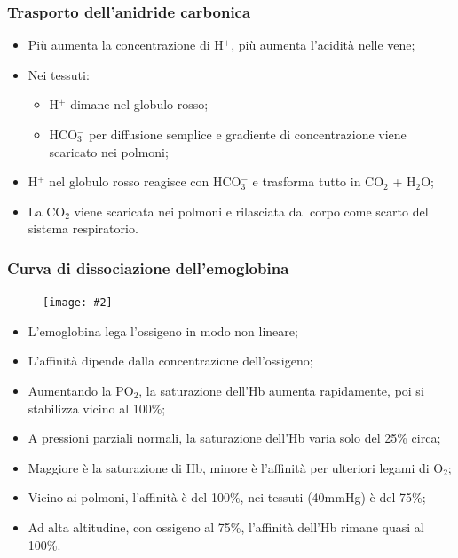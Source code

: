 \documentclass{article}
\newcommand{\cfig}[2]{
    \phantom{}
    \begin{figure}[ht!]
        \begin{center}
            \texttt{[image: \#2]}
        \end{center}
    \end{figure}
}
\begin{document}
\subsubsection{Trasporto dell'anidride carbonica}
\begin{itemize}
    \item Più aumenta la concentrazione di H$^+$, più aumenta l'acidità nelle vene;
    \item Nei tessuti:
        \begin{itemize}
            \item H$^+$ dimane nel globulo rosso;
            \item HCO$_3^-$ per diffusione semplice e gradiente di concentrazione viene
                scaricato nei polmoni;
        \end{itemize}
    \item H$^+$ nel globulo rosso reagisce con HCO$_3^-$ e trasforma tutto in CO$_2$ + H$_2$O;
    \item La CO$_2$ viene scaricata nei polmoni e rilasciata dal corpo come scarto del
        sistema respiratorio.
\end{itemize}

\subsubsection{Curva di dissociazione dell'emoglobina}

\cfig{.5}{media/emoglobina.png}

\begin{itemize}
    \item L'emoglobina lega l'ossigeno in modo non lineare;
    \item L'affinità dipende dalla concentrazione dell'ossigeno;
    \item Aumentando la PO$_2$, la saturazione dell'Hb aumenta rapidamente, poi si stabilizza
        vicino al 100\%;
    \item A pressioni parziali normali, la saturazione dell'Hb varia solo del 25\% circa;
    \item Maggiore è la saturazione di Hb, minore è l'affinità per ulteriori legami di O$_2$;
    \item Vicino ai polmoni, l'affinità è del 100\%, nei tessuti (40mmHg) è del 75\%;
    \item Ad alta altitudine, con ossigeno al 75\%, l'affinità dell'Hb rimane quasi al 100\%.
\end{itemize}
\end{document}
